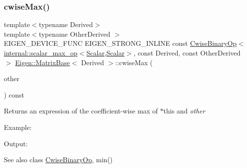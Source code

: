 \subsubsection{\texorpdfstring{cwiseMax()}{cwiseMax()}\hspace{0.1cm}{\footnotesize\ttfamily [1/2]}}
{\footnotesize\ttfamily template$<$typename Derived$>$ \\
template$<$typename Other\+Derived $>$ \\
E\+I\+G\+E\+N\+\_\+\+D\+E\+V\+I\+C\+E\+\_\+\+F\+U\+NC E\+I\+G\+E\+N\+\_\+\+S\+T\+R\+O\+N\+G\+\_\+\+I\+N\+L\+I\+NE const \mbox{\hyperlink{class_eigen_1_1_cwise_binary_op}{Cwise\+Binary\+Op}}$<$\mbox{\hyperlink{struct_eigen_1_1internal_1_1scalar__max__op}{internal\+::scalar\+\_\+max\+\_\+op}}$<$\mbox{\hyperlink{class_eigen_1_1_dense_base_a5feed465b3a8e60c47e73ecce83e39a2}{Scalar}},\mbox{\hyperlink{class_eigen_1_1_dense_base_a5feed465b3a8e60c47e73ecce83e39a2}{Scalar}}$>$, const Derived, const Other\+Derived$>$ \mbox{\hyperlink{class_eigen_1_1_matrix_base}{Eigen\+::\+Matrix\+Base}}$<$ Derived $>$\+::cwise\+Max (\begin{DoxyParamCaption}\item[{const E\+I\+G\+E\+N\+\_\+\+C\+U\+R\+R\+E\+N\+T\+\_\+\+S\+T\+O\+R\+A\+G\+E\+\_\+\+B\+A\+S\+E\+\_\+\+C\+L\+A\+SS$<$ Other\+Derived $>$ \&}]{other }\end{DoxyParamCaption}) const\hspace{0.3cm}{\ttfamily [inline]}}

\begin{DoxyReturn}{Returns}
an expression of the coefficient-\/wise max of $\ast$this and {\itshape other} 
\end{DoxyReturn}
Example\+: 
\begin{DoxyCodeInclude}{0}
\end{DoxyCodeInclude}
 Output\+: 
\begin{DoxyVerbInclude}
\end{DoxyVerbInclude}


\begin{DoxySeeAlso}{See also}
class \mbox{\hyperlink{class_eigen_1_1_cwise_binary_op}{Cwise\+Binary\+Op}}, min() 
\end{DoxySeeAlso}
\mbox{\label{class_eigen_1_1_matrix_base_aaf3ed6d9cad060b3e5685b3839271706}} 
